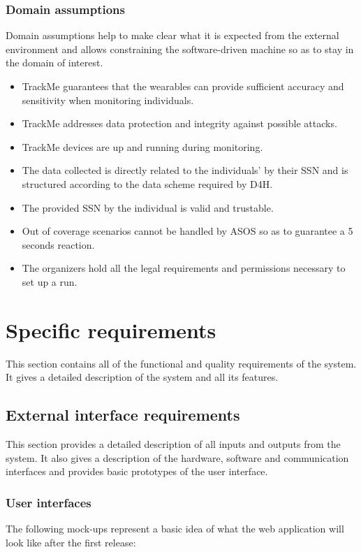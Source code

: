 \documentclass[a4paper, hidelinks, 12pt]{report}
\newcommand\assumption[1]{\item[{[D#1]}] }
\begin{document}
	\subsection{Domain assumptions}
	Domain assumptions help to make clear what it is expected from the external environment and allows constraining the software-driven machine so as to stay in the domain of interest.
	\begin{itemize}
		\assumption{1} TrackMe guarantees that the wearables can provide sufficient accuracy and sensitivity when monitoring individuals.
		\assumption{2} TrackMe addresses data protection and integrity against possible attacks.
		\assumption{3} TrackMe devices are up and running during monitoring.
		\assumption{4} The data collected is directly related to the individuals' by their SSN and is structured according to the data scheme required by D4H.
		\assumption{5} The provided SSN by the individual is valid and trustable.
		\assumption{6} Out of coverage scenarios cannot be handled by ASOS so as to guarantee a 5 seconds reaction.
		\assumption{7} The organizers hold all the legal requirements and permissions necessary to set up a run.
	\end{itemize}
	
	\chapter{Specific requirements}
	This section contains all of the functional and quality requirements of the system. It gives a detailed
	description of the system and all its features.
	
	\section{External interface requirements}
	This section provides a detailed description of all inputs and outputs from the system. It also gives a
	description of the hardware, software and communication interfaces and provides basic prototypes of the
	user interface.
	
	\subsection{User interfaces}
	The following mock-ups represent a basic idea of what the web application will look like after the first release:\\
	
\end{document}
